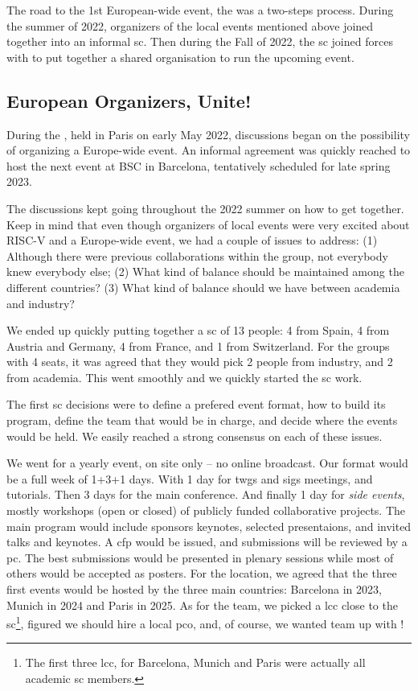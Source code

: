 \documentclass[
	a4paper, %
	10pt, %
	unnumberedsections, %
	twoside, %
]{LTJournalArticle}
\begin{document}
The road to the 1st European-wide event, the  was
a two-steps process. During the summer of 2022, organizers of the
local events mentioned above joined together into an informal
\gls{sc}. Then during the Fall of 2022, the \gls{sc} joined forces
with  to put together a shared organisation to run
the upcoming event.

\subsection{European Organizers, Unite!}

During the , held in Paris on early May 2022,
discussions began on the possibility of organizing a Europe-wide
event. An informal agreement was quickly reached to host the next
event at BSC in Barcelona, tentatively scheduled for late spring 2023.

The discussions kept going throughout the 2022 summer on how to get
together. Keep in mind that even though organizers of local events
were very excited about RISC-V and a Europe-wide event, we had a
couple of issues to address: (1) Although there were previous
collaborations within the group, not everybody knew everybody else;
(2) What kind of balance should be maintained among the different
countries? (3) What kind of balance should we have between academia
and industry?

We ended up quickly putting together a \gls{sc} of 13 people: 4 from
Spain, 4 from Austria and Germany, 4 from France, and 1 from
Switzerland. For the groups with 4 seats, it was agreed that they
would pick 2 people from industry, and 2 from academia. This went
smoothly and we quickly started the \gls{sc} work.

The first \gls{sc} decisions were to define a prefered event format,
how to build its program, define the team that would be in charge, and
decide where the events would be held. We easily reached a strong
consensus on each of these issues.

We went for a yearly event, on site only -- no online broadcast. Our
format would be a full week of 1+3+1 days. With 1 day for \glspl{twg}
and \glspl{sig} meetings, and tutorials. Then 3 days for the main
conference. And finally 1 day for \emph{side events}, mostly workshops
(open or closed) of publicly funded collaborative projects. The main
program would include sponsors keynotes, selected presentaions, and
invited talks and keynotes. A \gls{cfp} would be issued, and
submissions will be reviewed by a \gls{pc}. The best submissions would
be presented in plenary sessions while most of others would be
accepted as posters.  For the location, we agreed that the three first
events would be hosted by the three main countries: Barcelona in 2023,
Munich in 2024 and Paris in 2025. As for the team, we picked a
\gls{lcc} close to the \gls{sc}\footnote{The first three \gls{lcc},
for Barcelona, Munich and Paris were actually all academic \gls{sc}
members.}, figured we should hire a local \gls{pco}, and, of course,
we wanted team up with !
\end{document}
